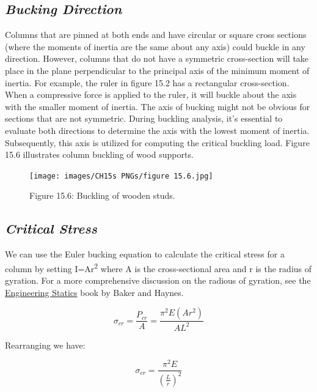 \documentclass[
  letterpaper,
  DIV=11,
  numbers=noendperiod]{scrreprt}
\begin{document}
\subsection{\texorpdfstring{\emph{Bucking
Direction}}{Bucking Direction}}\label{bucking-direction}

Columns that are pinned at both ends and have circular or square cross
sections (where the moments of inertia are the same about any axis)
could buckle in any direction. However, columns that do not have a
symmetric cross-section will take place in the plane perpendicular to
the principal axis of the minimum moment of inertia. For example, the
ruler in figure 15.2 has a rectangular cross-section. When a compressive
force is applied to the ruler, it will buckle about the axis with the
smaller moment of inertia. The axis of bucking might not be obvious for
sections that are not symmetric. During buckling analysis, it's
essential to evaluate both directions to determine the axis with the
lowest moment of inertia. Subsequently, this axis is utilized for
computing the critical buckling load. Figure 15.6 illustrates column
buckling of wood supports.

\begin{figure}[H]

{\centering \texttt{[image: images/CH15s PNGs/figure 15.6.jpg]}

}

\caption{Figure 15.6: Buckling of wooden studs.}

\end{figure}%

\subsection{\texorpdfstring{\emph{Critical
Stress}}{Critical Stress}}\label{critical-stress}

We can use the Euler bucking equation to calculate the critical stress
for a column by setting I=Ar\textsuperscript{2} where A is the
cross-sectional area and r is the radius of gyration. For a more
comprehensive discussion on the radious of gyration, see the
\href{https://engineeringstatics.org/radius-of-gyration-sec.html}{Engineering
Statics} book by Baker and Haynes.

\[
\sigma_{c r}=\frac{P_{c r}}{A}=\frac{\pi^2 E\left(A r^2\right)}{A L^2}
\]

Rearranging we have:

\[
\sigma_{c r}=\frac{\pi^2 E}{\left(\frac{L}{r}\right)^2}
\]
\end{document}
